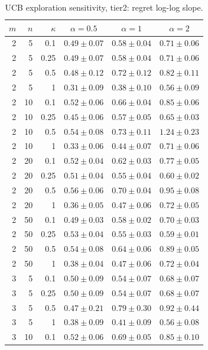 \begin{table}[htbp]
\centering
\scriptsize
\caption{UCB exploration sensitivity, tier2: regret log-log slope.}
\label{tab:ucb_alpha_tier2_regret_slope}
\begin{tabular}{@{}rrrccc@{}}
\toprule
$m$ & $n$ & $\kappa$ & $\alpha=0.5$ & $\alpha=1$ & $\alpha=2$ \\
\midrule
2 & 5 & 0.1 & $0.49 \pm 0.07$ & $0.58 \pm 0.04$ & $0.71 \pm 0.06$ \\
2 & 5 & 0.25 & $0.49 \pm 0.07$ & $0.58 \pm 0.04$ & $0.71 \pm 0.06$ \\
2 & 5 & 0.5 & $0.48 \pm 0.12$ & $0.72 \pm 0.12$ & $0.82 \pm 0.11$ \\
2 & 5 & 1 & $0.31 \pm 0.09$ & $0.38 \pm 0.10$ & $0.56 \pm 0.09$ \\
2 & 10 & 0.1 & $0.52 \pm 0.06$ & $0.66 \pm 0.04$ & $0.85 \pm 0.06$ \\
2 & 10 & 0.25 & $0.45 \pm 0.06$ & $0.57 \pm 0.05$ & $0.65 \pm 0.03$ \\
2 & 10 & 0.5 & $0.54 \pm 0.08$ & $0.73 \pm 0.11$ & $1.24 \pm 0.23$ \\
2 & 10 & 1 & $0.33 \pm 0.06$ & $0.44 \pm 0.07$ & $0.71 \pm 0.06$ \\
2 & 20 & 0.1 & $0.52 \pm 0.04$ & $0.62 \pm 0.03$ & $0.77 \pm 0.05$ \\
2 & 20 & 0.25 & $0.51 \pm 0.04$ & $0.55 \pm 0.04$ & $0.60 \pm 0.02$ \\
2 & 20 & 0.5 & $0.56 \pm 0.06$ & $0.70 \pm 0.04$ & $0.95 \pm 0.08$ \\
2 & 20 & 1 & $0.36 \pm 0.05$ & $0.47 \pm 0.06$ & $0.72 \pm 0.05$ \\
2 & 50 & 0.1 & $0.49 \pm 0.03$ & $0.58 \pm 0.02$ & $0.70 \pm 0.03$ \\
2 & 50 & 0.25 & $0.53 \pm 0.04$ & $0.55 \pm 0.03$ & $0.59 \pm 0.01$ \\
2 & 50 & 0.5 & $0.54 \pm 0.08$ & $0.64 \pm 0.06$ & $0.89 \pm 0.05$ \\
2 & 50 & 1 & $0.38 \pm 0.04$ & $0.47 \pm 0.06$ & $0.72 \pm 0.04$ \\
\midrule
3 & 5 & 0.1 & $0.50 \pm 0.09$ & $0.54 \pm 0.07$ & $0.68 \pm 0.07$ \\
3 & 5 & 0.25 & $0.50 \pm 0.09$ & $0.54 \pm 0.07$ & $0.68 \pm 0.07$ \\
3 & 5 & 0.5 & $0.47 \pm 0.21$ & $0.79 \pm 0.30$ & $0.92 \pm 0.44$ \\
3 & 5 & 1 & $0.38 \pm 0.09$ & $0.41 \pm 0.09$ & $0.56 \pm 0.08$ \\
3 & 10 & 0.1 & $0.52 \pm 0.06$ & $0.69 \pm 0.05$ & $0.85 \pm 0.10$ \\

\end{tabular}
\end{table}

